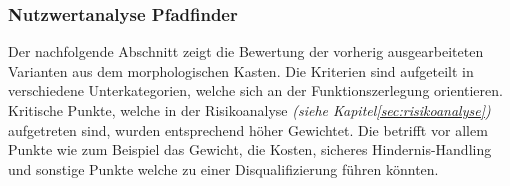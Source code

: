 \documentclass[main.tex]{subfiles} %
\begin{document}
\subsubsection{Nutzwertanalyse Pfadfinder}
Der nachfolgende Abschnitt zeigt die Bewertung der vorherig ausgearbeiteten
Varianten aus dem morphologischen Kasten. Die Kriterien sind aufgeteilt in
verschiedene Unterkategorien, welche sich an der Funktionszerlegung
orientieren. Kritische Punkte, welche in der Risikoanalyse \textit{(siehe
    Kapitel\ref{sec:risikoanalyse})} aufgetreten sind, wurden entsprechend höher
Gewichtet. Die betrifft vor allem Punkte wie zum Beispiel das Gewicht, die
Kosten, sicheres Hindernis-Handling und sonstige Punkte welche zu einer
Disqualifizierung führen könnten. %

\begin{landscape} %
    \thispagestyle{fancy}


\end{landscape}
\end{document}
